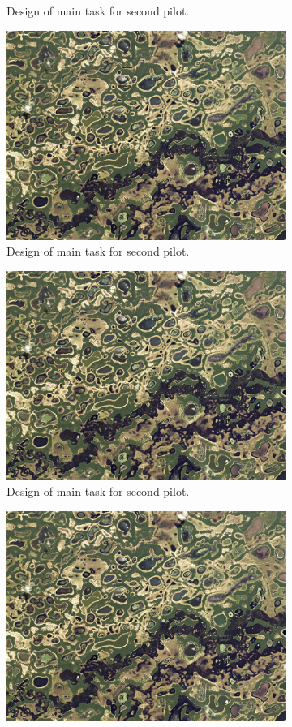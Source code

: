 \begin{figure}[!htb]
\begin{subfigure}{0.5\textwidth}
  \caption{Design of main task for second pilot.}
  \label{v2.requirement.examples.3}
\end{subfigure}
\begin{subfigure}{0.5\textwidth}
  \centering
  \includegraphics[width=.8\linewidth]{pantanal.jpeg}  
  \caption{Design of main task for second pilot.}
  \label{v2.requirement.examples.4}
\end{subfigure}
\newline
\begin{subfigure}{0.5\textwidth}
  \centering
  \includegraphics[width=.8\linewidth]{pantanal.jpeg}  
  \caption{Design of main task for second pilot.}
  \label{v2.requirement.examples.5}
\end{subfigure}
\begin{subfigure}{0.5\textwidth}
  \centering
  \includegraphics[width=.8\linewidth]{pantanal.jpeg}  

\end{subfigure}
\end{figure}
